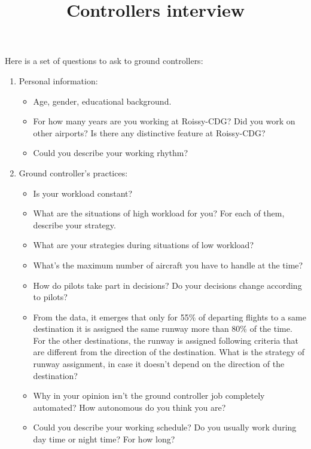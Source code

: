 \documentclass{article}
\begin{document}
		
	\title{Controllers interview}
	\maketitle
Here is a set of questions to ask to ground controllers:

\begin{enumerate}
    \item Personal information:
        \begin{itemize}
            \item Age, gender, educational background.
            \item For how many years are you working at Roissy-CDG? Did you work on other airports? Is there any distinctive feature at Roissy-CDG? 

            \item Could you describe your working rhythm?
        \end{itemize}
    \item Ground controller's practices:
        \begin{itemize}
            \item Is your workload constant? 
            \item What are the situations of high workload for you? For each of them, describe your strategy.
            \item What are your strategies during situations of low workload?
            \item What's the maximum number of aircraft you have to handle at the time?
            \item How do pilots take part in decisions? Do your decisions change according to pilots?
            \item From the data, it emerges that only for 55\% of departing flights to a same destination it is assigned the same runway more than 80\% of the time. For the other destinations, the runway is assigned following criteria that are different from the direction of the destination. What is the strategy of runway assignment, in case it doesn't depend on the direction of the destination?
            \item Why in your opinion isn't the ground controller job completely automated? How autonomous do you think you are?
            \item Could you describe your working schedule? Do you usually work during day time or night time? For how long?
            

\end{itemize}
\end{enumerate}
\end{document}
